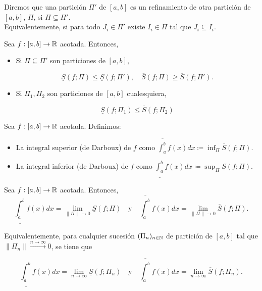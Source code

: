 \documentclass[a4paper]{report}
\begin{document}
	\begin{definition}[refinamiento]
		Diremos que una partición $\Pi'$ de $[a,b]$ es un refinamiento de otra partición de $[a,b]$, $\Pi$, si $\Pi\subseteq\Pi'$. \\
		Equivalentemente, si para todo $J_i\in\Pi'$ existe $I_i\in\Pi$ tal que $J_i\subseteq I_i$.
	\end{definition}

	\begin{prop}
		Sea $f:[a,b]\to\mathbb{R}$ acotada. Entonces,
		\begin{itemize}
			\item Si $\Pi\subseteq\Pi'$ son particiones de $[a,b]$,

			\[
			\underline{S}(f;\Pi)\leq\underline{S}(f;\Pi'),\quad\overline{S}(f;\Pi)\geq\overline{S}(f;\Pi').
			\]

			\item Si $\Pi_1,\Pi_2$ son particiones de $[a,b]$ cualesquiera,

			\[
			\underline{S}(f;\Pi_1)\leq\overline{S}(f;\Pi_2)
			\]
		\end{itemize}
	\end{prop}

	\begin{definition}
		Sea $f:[a,b]\to\mathbb{R}$ acotada. Definimos:
		\begin{itemize}
			\item La integral superior (de Darboux) de $f$ como $\overline{\int_{a}^{b}} f(x) dx \coloneq \displaystyle{\inf_{\Pi}} \overline{S}(f;\Pi)$.
			
			\item La integral inferior (de Darboux) de $f$ como $\underline{\int_{a}^{b}} f(x) dx \coloneq \displaystyle{\sup_{\Pi}} \underline{S}(f;\Pi)$.
		\end{itemize}
	\end{definition}

	\begin{theorem}
		Sea $f:[a,b]\to\mathbb{R}$ acotada. Entonces,
		\[
		\underline{\int_{a}^{b}} f(x) dx = \displaystyle{\lim_{\|\Pi\|\to 0}} \underline{S}(f;\Pi)\quad \text{y} \quad \overline{\int_{a}^{b}} f(x) dx = \displaystyle{\lim_{\|\Pi\|\to 0}}\overline{S}(f;\Pi).
		\]
	\end{theorem}

	\begin{remark}
		Equivalentemente, para cualquier sucesión $(\Pi_n)_{n\in\mathbb{N}}$ de partición de $[a,b]$ tal que $\|\Pi_n\|\xrightarrow{n\to\infty} 0$, se tiene que 

		\[
		\underline{\int_{a}^{b}} f(x) dx = \lim_{n\to\infty} \underline{S}(f;\Pi_n)\quad\text{y}\quad \overline{\int_{a}^{b}} f(x) dx = \lim_{n\to \infty} \overline{S}(f;\Pi_n).
		\]
	\end{remark}
\end{document}
